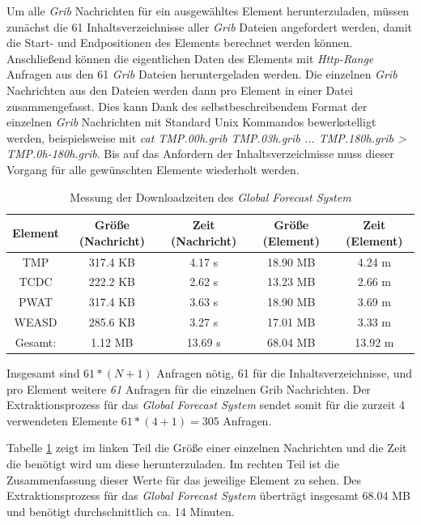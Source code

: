 Um alle \textit{Grib} Nachrichten für ein ausgewähltes Element
herunterzuladen, müssen zunächst die 61 Inhaltsverzeichnisse aller
\textit{Grib} Dateien angefordert werden, damit die Start- und
Endpositionen des Elements berechnet werden können. Anschließend
können die eigentlichen Daten des Elements mit \textit{Http-Range}
Anfragen aus den 61 \textit{Grib} Dateien heruntergeladen werden. Die
einzelnen \textit{Grib} Nachrichten aus den Dateien werden dann pro
Element in einer Datei zusammengefasst. Dies kann Dank des
selbstbeschreibendem Format der einzelnen \textit{Grib} Nachrichten
mit Standard Unix Kommandos bewerkstelligt werden, beispielsweise mit
\textit{cat TMP.00h.grib TMP.03h.grib ... TMP.180h.grib >
  TMP.0h-180h.grib}. Bis auf das Anfordern der Inhaltsverzeichnisse
muss dieser Vorgang für alle gewünschten Elemente wiederholt werden.

\begin{table}[h]
  \centering
  {\sf
    \footnotesize
    \begin{longtable}{@{}ccccc}
      \toprule
      \textbf{Element} & \textbf{Größe (Nachricht)} & \textbf{Zeit (Nachricht)} & \textbf{Größe (Element)} & \textbf{Zeit (Element)} \\
      \midrule
      TMP   & 317.4 KB & 4.17 s & 18.90 MB & 4.24 m \\
      TCDC  & 222.2 KB & 2.62 s & 13.23 MB & 2.66 m \\
      PWAT  & 317.4 KB & 3.63 s & 18.90 MB & 3.69 m \\
      WEASD & 285.6 KB & 3.27 s & 17.01 MB & 3.33 m \\
      \midrule
      Gesamt: & 1.12 MB  & 13.69 s & 68.04 MB & 13.92 m \\
      \bottomrule
    \end{longtable}
  }
  \caption{Messung der Downloadzeiten des \textit{Global Forecast System}}
  \label{tab:download_messung_gfs}
\end{table}

Insgesamt sind $ 61 * (N+1) $ Anfragen nötig, 61 für die
Inhaltsverzeichnisse, und pro Element weitere \textit{61} Anfragen für
die einzelnen Grib Nachrichten. Der Extraktionsprozess für das
\textit{Global Forecast System} sendet somit für die zurzeit 4
verwendeten Elemente $ 61 * (4+1) = 305$ Anfragen.

Tabelle \ref{tab:download_messung_gfs} zeigt im linken Teil die Größe
einer einzelnen Nachrichten und die Zeit die benötigt wird um diese
herunterzuladen. Im rechten Teil ist die Zusammenfassung dieser Werte
für das jeweilige Element zu sehen. Des Extraktionsprozess für das
\textit{Global Forecast System} überträgt insgesamt 68.04 MB und
benötigt durchschnittlich ca. 14 Minuten.

